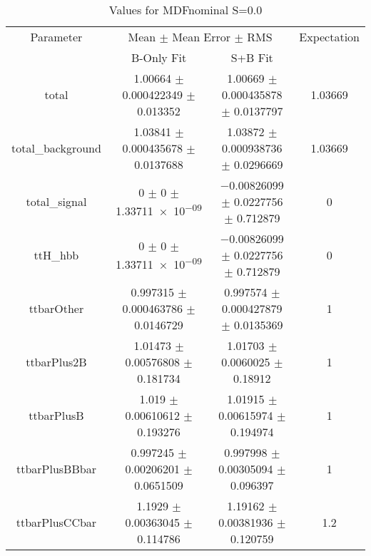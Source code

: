 \begin{table}
\centering
\caption{Values for MDFnominal S=0.0}
\begin{tabular}{cccc}
\toprule
Parameter & \multicolumn{2}{c}{Mean $\pm$ Mean Error $\pm$ RMS} & Expectation\\
 & B-Only Fit & S+B Fit & \\
\midrule
total & \num{1.00664} $\pm$ \num{0.000422349} $\pm$ \num{0.013352} & \num{1.00669} $\pm$ \num{0.000435878} $\pm$ \num{0.0137797} & \num{1.03669}\\
total\_background & \num{1.03841} $\pm$ \num{0.000435678} $\pm$ \num{0.0137688} & \num{1.03872} $\pm$ \num{0.000938736} $\pm$ \num{0.0296669} & \num{1.03669}\\
total\_signal & \num{0} $\pm$ \num{0} $\pm$ \num{1.33711e-09} & \num{-0.00826099} $\pm$ \num{0.0227756} $\pm$ \num{0.712879} & \num{0}\\
ttH\_hbb & \num{0} $\pm$ \num{0} $\pm$ \num{1.33711e-09} & \num{-0.00826099} $\pm$ \num{0.0227756} $\pm$ \num{0.712879} & \num{0}\\
ttbarOther & \num{0.997315} $\pm$ \num{0.000463786} $\pm$ \num{0.0146729} & \num{0.997574} $\pm$ \num{0.000427879} $\pm$ \num{0.0135369} & \num{1}\\
ttbarPlus2B & \num{1.01473} $\pm$ \num{0.00576808} $\pm$ \num{0.181734} & \num{1.01703} $\pm$ \num{0.0060025} $\pm$ \num{0.18912} & \num{1}\\
ttbarPlusB & \num{1.019} $\pm$ \num{0.00610612} $\pm$ \num{0.193276} & \num{1.01915} $\pm$ \num{0.00615974} $\pm$ \num{0.194974} & \num{1}\\
ttbarPlusBBbar & \num{0.997245} $\pm$ \num{0.00206201} $\pm$ \num{0.0651509} & \num{0.997998} $\pm$ \num{0.00305094} $\pm$ \num{0.096397} & \num{1}\\
ttbarPlusCCbar & \num{1.1929} $\pm$ \num{0.00363045} $\pm$ \num{0.114786} & \num{1.19162} $\pm$ \num{0.00381936} $\pm$ \num{0.120759} & \num{1.2}\\
\bottomrule
\end{tabular}
\end{table}